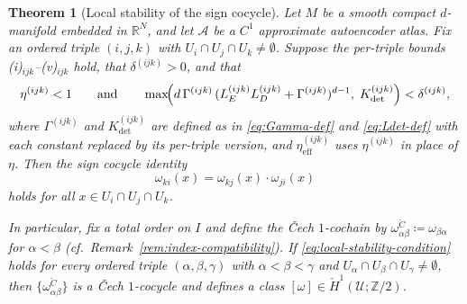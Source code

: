 \documentclass[11pt]{article}
\newcommand{\R}{\mathbb{R}}
\newcommand{\Z}{\mathbb{Z}}
\theoremstyle{plain}
\newtheorem{theorem}{Theorem}[section]
\theoremstyle{definition}
\theoremstyle{remark}
\begin{document}
\begin{theorem}[Local stability of the sign cocycle]\label{thm:local-stability}
Let $M$ be a smooth compact $d$-manifold embedded in $\R^N$, and let $\mathcal{A}$ be a $C^1$ approximate autoencoder atlas. Fix an ordered triple $(i, j, k)$ with $U_i \cap U_j \cap U_k \neq \emptyset$. Suppose the per-triple bounds (i)$_{ijk}$--(v)$_{ijk}$ hold, that $\delta^{(ijk)} > 0$, and that
\begin{equation}\label{eq:local-stability-condition}
\eta^{(ijk)} < 1 \qquad \text{and} \qquad \max\!\Bigl(d\,\Gamma^{(ijk)}\,(L_E^{(ijk)} L_D^{(ijk)} + \Gamma^{(ijk)})^{d-1},\; K_{\det}^{(ijk)}\Bigr) < \delta^{(ijk)},
\end{equation}
where $\Gamma^{(ijk)}$ and $K_{\det}^{(ijk)}$ are defined as in \eqref{eq:Gamma-def} and \eqref{eq:Ldet-def} with each constant replaced by its per-triple version, and $\eta_{\mathrm{eff}}^{(ijk)}$ uses $\eta^{(ijk)}$ in place of $\eta$. Then the sign cocycle identity
\[
\omega_{ki}(x) = \omega_{kj}(x) \cdot \omega_{ji}(x)
\]
holds for all $x \in U_i \cap U_j \cap U_k$.

In particular, fix a total order on $I$ and define the \v{C}ech 
$1$-cochain by $\omega_{\alpha\beta}^{\check{C}} 
\coloneqq \omega_{\beta\alpha}$ for $\alpha < \beta$ 
(cf.\ Remark~\ref{rem:index-compatibility}). If 
\eqref{eq:local-stability-condition} holds for every ordered triple 
$(\alpha, \beta, \gamma)$ with $\alpha < \beta < \gamma$ and 
$U_\alpha \cap U_\beta \cap U_\gamma \neq \emptyset$, then 
$\{\omega_{\alpha\beta}^{\check{C}}\}$ is a \v{C}ech $1$-cocycle 
and defines a class 
$[\omega] \in \check{H}^1(\mathcal{U}; \Z/2)$.
\end{theorem}
\end{document}

